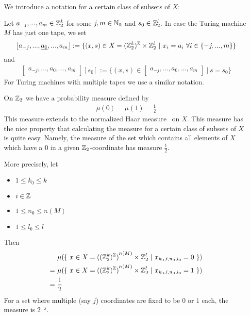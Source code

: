 \begin{Notation}
	We introduce a notation for a certain class of subsets of $X$:

	Let $a_{-j},...,a_{m} \in \mathbb{Z}_2^k$ for some $j, m \in \mathbb{N}_0$ and $s_0 \in \mathbb{Z}_2^l$. In case the Turing machine $M$ has just one tape, we set
	\begin{align*}
		\begin{bmatrix}
			a_{-j},...,\underline{a_0},...,a_m
		\end{bmatrix} := \{ (x,s) \in X = (\mathbb{Z}_2^k)^{\mathbb{Z}} \times \mathbb{Z}_2^l ~|~ x_i = a_i ~\forall i \in \{-j,...,m\}\} 
	\end{align*}
	and
	\begin{align*}
		\begin{bmatrix}
			a_{-j},...,\underline{a_0},...,a_m
		\end{bmatrix} [ s_0 ] := \{ (x,s) \in \begin{bmatrix} a_{-j},...,\underline{a_0},...,a_m \end{bmatrix} ~|~ s = s_0 \}
	\end{align*}
	For Turing machines with multiple tapes we use a similar notation.
\end{Notation}

On $\mathbb{Z}_2$ we have a probability measure defined by
\begin{align*}
	\mu(0) = \mu(1) = \frac12
\end{align*}
This measure extends to the normalized Haar measure\footnotemark~ on $X$.
This measure has the nice property that calculating the measure for a certain class of subsets of $X$ is quite easy.
Namely, the measure of the set which contains all elements of $X$ which have a $0$ in a given $\mathbb{Z}_2$-coordinate has measure $\frac12$.

More precisely, let
\begin{itemize}
	\item $1 \leq k_0 \leq k$
	\item $i \in \mathbb{Z}$
	\item $1 \leq n_0 \leq n(M)$
	\item $1 \leq l_0 \leq l$
\end{itemize}
Then
\begin{align*}
	  &\mu (\{~ x \in X = {{((\mathbb{Z}_2^{k})^{\mathbb{Z}})}^{n(M)}} \times \mathbb{Z}_2^l ~|~ x_{k_0,i,n_0,l_0} = 0 ~\}) \\
	=~&\mu (\{~ x \in X = {{((\mathbb{Z}_2^{k})^{\mathbb{Z}})}^{n(M)}} \times \mathbb{Z}_2^l ~|~ x_{k_0,i,n_0,l_0} = 1 ~\}) \\
	=~&\frac12
\end{align*}
For a set where multiple (say $j$) coordinates are fixed to be $0$ or $1$ each, the measure is $2^{-j}$.


